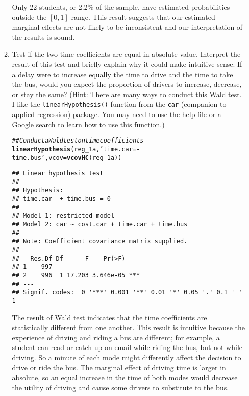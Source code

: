 \documentclass[11pt,letterpaper]{article}\usepackage[]{graphicx}\usepackage[]{color}
\makeatletter
\newcommand{\hlstr}[1]{\textcolor[rgb]{0.192,0.494,0.8}{#1}}%
\newcommand{\hlcom}[1]{\textcolor[rgb]{0.678,0.584,0.686}{\textit{#1}}}%
\newcommand{\hlstd}[1]{\textcolor[rgb]{0.345,0.345,0.345}{#1}}%
\newcommand{\hlkwc}[1]{\textcolor[rgb]{0.333,0.667,0.333}{#1}}%
\newcommand{\hlkwd}[1]{\textcolor[rgb]{0.737,0.353,0.396}{\textbf{#1}}}%
\newenvironment{kframe}{%
 \def\at@end@of@kframe{}%
 \ifinner\ifhmode%
  \def\at@end@of@kframe{\end{minipage}}%
  \begin{minipage}{\columnwidth}%
 \fi\fi%
 \def\FrameCommand##1{\hskip\@totalleftmargin \hskip-\fboxsep
 \colorbox{shadecolor}{##1}\hskip-\fboxsep
     \hskip-\linewidth \hskip-\@totalleftmargin \hskip\columnwidth}%
 \MakeFramed {\advance\hsize-\width
   \@totalleftmargin\z@ \linewidth\hsize
   \@setminipage}}%
 {\par\unskip\endMakeFramed%
 \at@end@of@kframe}
\newenvironment{knitrout}{}{} %
\makeatother
\begin{document}
\begin{enumerate}[label=\alph*., leftmargin=*]
\begin{enumerate}[label=\roman*.]
		Only 22 students, or 2.2\% of the sample, have estimated probabilities outside the $[0, 1]$ range. This result suggests that our estimated marginal effects are not likely to be inconsistent and our interpretation of the results is sound.

		\item Test if the two time coefficients are equal in absolute value. Interpret the result of this test and briefly explain why it could make intuitive sense. If a delay were to increase equally the time to drive and the time to take the bus, would you expect the proportion of drivers to increase, decrease, or stay the same? (Hint: There are many ways to conduct this Wald test. I like the \texttt{linearHypothesis()} function from the \texttt{car} (companion to applied regression) package. You may need to use the help file or a Google search to learn how to use this function.) 

\begin{knitrout}
\color{fgcolor}\begin{kframe}
\begin{alltt}
\hlcom{## Conduct a Wald test on time coefficients}
\hlkwd{linearHypothesis}\hlstd{(reg_1a,} \hlstr{'time.car = -time.bus'}\hlstd{,} \hlkwc{vcov} \hlstd{=} \hlkwd{vcovHC}\hlstd{(reg_1a))}
\end{alltt}
\begin{verbatim}
## Linear hypothesis test
## 
## Hypothesis:
## time.car  + time.bus = 0
## 
## Model 1: restricted model
## Model 2: car ~ cost.car + time.car + time.bus
## 
## Note: Coefficient covariance matrix supplied.
## 
##   Res.Df Df      F    Pr(>F)    
## 1    997                        
## 2    996  1 17.203 3.646e-05 ***
## ---
## Signif. codes:  0 '***' 0.001 '**' 0.01 '*' 0.05 '.' 0.1 ' ' 1
\end{verbatim}
\end{kframe}
\end{knitrout}

		The result of Wald test indicates that the time coefficients are statistically different from one another. This result is intuitive because the experience of driving and riding a bus are different; for example, a student can read or catch up on email while riding the bus, but not while driving. So a minute of each mode might differently affect the decision to drive or ride the bus. The marginal effect of driving time is larger in absolute, so an equal increase in the time of both modes would decrease the utility of driving and cause some drivers to substitute to the bus.
	\end{enumerate}
\end{enumerate}
\end{document}
